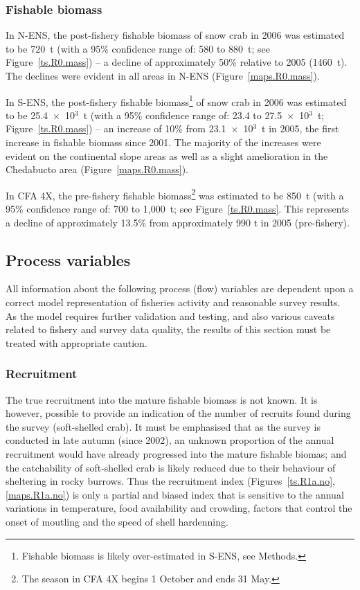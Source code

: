 \documentclass[11pt]{article}
\newcommand{\Xthou}{$\times$~10$^3$}
\begin{document}
\subsubsection{Fishable biomass}

In N-ENS, the post-fishery fishable biomass of snow crab in 2006 was estimated to be 720~t (with a 95\% confidence range of: 580 to 880~t; see Figure~\ref{ts.R0.mass}) -- a decline of approximately 50\% relative to 2005 (1460~t). The declines were evident in all areas in N-ENS (Figure~\ref{maps.R0.mass}).

In S-ENS, the post-fishery fishable biomass\footnote{Fishable biomass is likely over-estimated in S-ENS, see Methods.} of snow crab in 2006 was estimated to be 25.4~\Xthou~t (with a 95\% confidence range of: 23.4 to 27.5~\Xthou~t; Figure~\ref{ts.R0.mass}) -- an increase of 10\% from 23.1~\Xthou~t in 2005, the first increase in fishable biomass since 2001. The majority of the increases were evident on the continental slope areas as well as a slight amelioration in the Chedabucto area (Figure~\ref{maps.R0.mass}).

In CFA 4X, the pre-fishery fishable biomass\footnote{The season in CFA 4X begins 1 October and ends 31 May.} was estimated to be 850~t (with a 95\% confidence range of: 700 to 1,000~t; see Figure~\ref{ts.R0.mass}. This represents a decline of approximately 13.5\% from approximately 990 t in 2005 (pre-fishery).


\subsection{Process variables}

All information about the following process (flow) variables are dependent upon a correct model representation of fisheries activity and reasonable survey results. As the model requires further validation and testing, and also various caveats related to fishery and survey data quality, the results of this section must be treated with appropriate caution.

\subsubsection{Recruitment}

The true recruitment into the mature fishable biomass is not known. It is however, possible to provide an indication of the number of recruits found during the survey (soft-shelled crab). It must be emphasised that as the survey is conducted in late autumn (since 2002), an unknown proportion of the annual recruitment would have already progressed into the mature fishable biomas; and the catchability of soft-shelled crab is likely reduced due to their behaviour of sheltering in rocky burrows. Thus the recruitment index (Figures~\ref{ts.R1a.no}, \ref{maps.R1a.no}) is only a partial and biased index that is sensitive to the annual variations in temperature, food availability and crowding, factors that control the onset of moutling and the speed of shell hardenning. 
\end{document}
